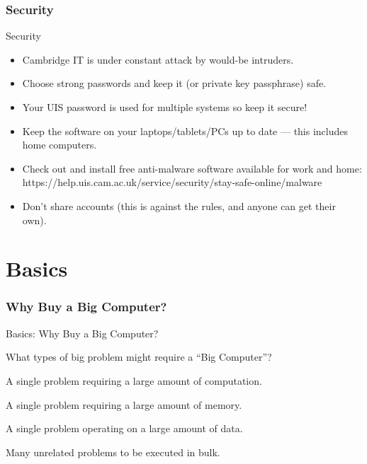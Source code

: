\section{Security}
\begin{frame}{Security}
\begin{itemize}
\item{Cambridge IT is under constant attack by would-be intruders.}
\pause
\item{\alert{Choose strong passwords and keep it (or private key passphrase) safe.}}
\pause
\item{\alert{Your UIS password is used for multiple systems so keep it secure!}}
\pause
\item{Keep the software on your laptops/tablets/PCs up to date --- this includes home computers.}
  \pause
\item{Check out and install free anti-malware software available for work and home:\hfill
  \null\qquad\alert{\small https://help.uis.cam.ac.uk/service/security/stay-safe-online/malware}}
  \pause
\item{Don't share accounts (this is against the rules, and anyone can get their own).}
\end{itemize}
\end{frame}


\part{Basics}
\frame{\partpage}

\section{Why Buy a Big Computer?}

\begin{frame}{Basics: Why Buy a Big Computer?}

What types of big problem might require a ``Big Computer''?

\begin{description}
\pause
\item[\textit{Compute Intensive:}]{A single problem requiring a large amount of computation.}
\pause
\item[\textit{Memory Intensive:}]{A single problem requiring a large amount of memory.}
\pause
\item[\textit{Data Intensive:}]{A single problem operating on a large amount of data.}
\pause
\item[\textit{High Throughput:}]{Many unrelated problems to be executed in bulk.}
\end{description}
\end{frame}

